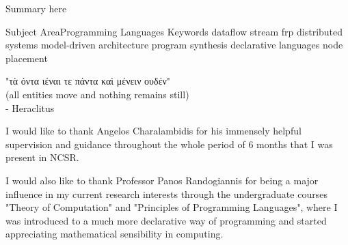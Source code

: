 \documentclass{dithesis}
\begin{document}



\maketitle

\begin{thesisabstract}[Abstract]
Summary here

\thesiskeywords
{Subject Area}{Programming Languages}
{Keywords}
	{dataflow}
	{stream}
	{frp}
	{distributed systems}
	{model-driven architecture}
	{program synthesis}
	{declarative languages}
	{node placement}
\end{thesisabstract}

\begin{thesisdedication}
"τὰ όντα ιέναι τε πάντα καὶ μένειν ουδέν" \\
(all entities move and nothing remains still) \\
- Heraclitus
\end{thesisdedication}

\begin{thesisacknowledgments}[Acknowledgements]

I would like to thank Angelos Charalambidis for his immensely helpful supervision and guidance throughout the whole period of 6 months that I was present in NCSR. 

I would also like to thank Professor Panos Randogiannis for being a major influence in my current research interests through the undergraduate courses "Theory of Computation" and "Principles of Programming Languages", where I was introduced to a much more declarative way of programming and started appreciating mathematical sensibility in computing.

\end{thesisacknowledgments}

\tableofcontents
\listoffigures
\end{document}
